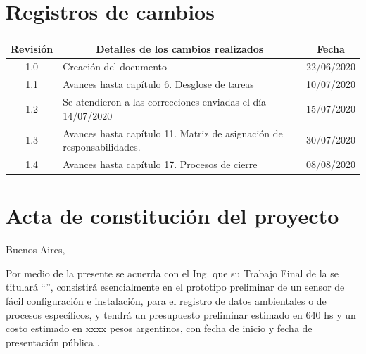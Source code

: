 \documentclass[11pt]{charter}
\begin{document}
\maketitle
\thispagestyle{empty}
\pagebreak


\thispagestyle{empty}
{\setlength{\parskip}{0pt}
\tableofcontents{}
}
\pagebreak


\section{Registros de cambios}
\label{sec:registro}


\begin{table}[ht]
\label{tab:registro}
\centering

\begin{tabularx}{\linewidth}{@{}|c|X|c|@{}}
\hline
\rowcolor[HTML]{C0C0C0} 
Revisión & \multicolumn{1}{c|}{\cellcolor[HTML]{C0C0C0}Detalles de los cambios realizados} & Fecha      \\ \hline
1.0      & Creación del documento                                                          & 22/06/2020 \\ \hline
1.1      & Avances hasta capítulo 6. Desglose de tareas									   & 10/07/2020 \\ \hline
1.2      & Se atendieron a las correcciones enviadas el día 14/07/2020                     & 15/07/2020 \\ \hline
1.3      & Avances hasta capítulo 11. Matriz de asignación de responsabilidades.           & 30/07/2020 \\ \hline
1.4      & Avances hasta capítulo 17. Procesos de cierre           						   & 08/08/2020 \\ \hline
\end{tabularx}
\end{table}

\pagebreak



\section{Acta de constitución del proyecto}
\label{sec:acta}

\begin{flushright}
Buenos Aires, \fechaInicioName
\end{flushright}

\vspace{2cm}

Por medio de la presente se acuerda con el Ing. \authorname\hspace{1px} que su Trabajo Final de la \degreename\hspace{1px} se titulará ``\ttitle'', consistirá esencialmente en el prototipo preliminar de un sensor de fácil configuración e instalación, para el registro de datos ambientales o de procesos específicos, y tendrá un presupuesto preliminar estimado en 640 hs y un costo estimado en xxxx pesos argentinos, con fecha de inicio \fechaInicioName\hspace{1px} y fecha de presentación pública \fechaFinalName.
\end{document}
